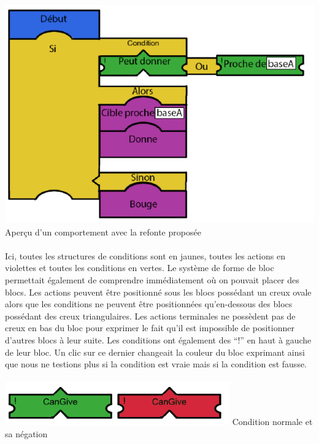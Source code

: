 \documentclass{report}
\begin{document}
\paragraph{}
\begin{center}
\includegraphics[scale=0.7]{DATA/propLangage.png}
 {Aperçu d'un comportement avec la refonte proposée}
\end{center}
\paragraph{}

Ici, toutes les structures de conditions sont en jaunes, toutes les actions en violettes et toutes les conditions en vertes. \newline
Le système de forme de bloc permettait également de comprendre immédiatement où on pouvait placer des blocs. Les actions peuvent être positionné sous les blocs possédant un creux ovale alors que les conditions ne peuvent être positionnées qu’en-dessous des blocs possédant des creux triangulaires.
Les actions terminales ne possèdent pas de creux en bas du bloc pour exprimer le fait qu’il est impossible de positionner d’autres blocs à leur suite. \newline
Les conditions ont également des “!” en haut à gauche de leur bloc. Un clic sur ce dernier changeait la couleur du bloc exprimant ainsi que nous ne testions plus si la condition est vraie mais si la condition est fausse.

\paragraph{}
\begin{center}
\includegraphics[scale=0.8]{DATA/negation.png}
 {Condition normale et sa négation}
\end{center}
\end{document}
